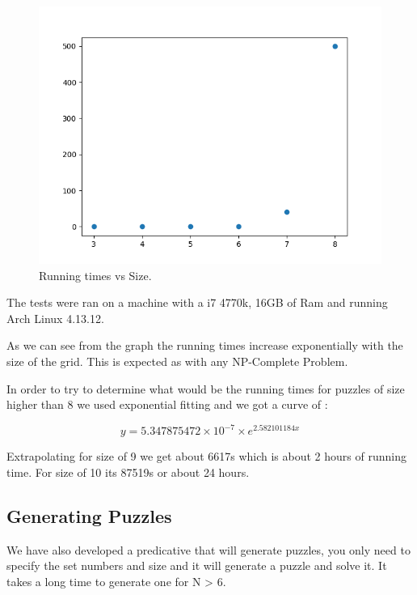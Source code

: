 \documentclass{llncs}
\begin{document}
\begin{figure}
  \centering
  \includegraphics[width=\textwidth*2/3]{times2.png}
\caption{Running times vs Size.}
  \label{fig:times}
\end{figure}

The tests were ran on a machine with a i7 4770k, 16GB of Ram and running Arch Linux 4.13.12.

As we can see from the graph the running times increase exponentially with the size of the grid. This is expected as with any NP-Complete Problem.
\linebreak

In order to try to determine what would be the running times for puzzles of size higher than 8 we used exponential fitting and we got a curve of :

\begin{equation}
y = 5.347875472 \times 10^{-7} \times e^{2.582101184 x}
\end{equation}

Extrapolating for size of 9 we get about 6617s which is about 2 hours of running time. For size of 10 its 87519s or about 24 hours. 

\subsection{Generating Puzzles}

We have also developed a predicative that will generate puzzles, you only need to specify the set numbers and size and it will generate a puzzle and solve it. It takes a long time to generate one for N > 6.
\end{document}
